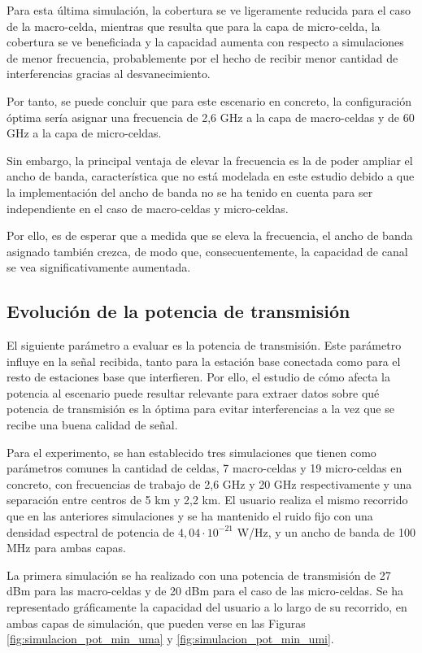Para esta última simulación, la cobertura se ve ligeramente reducida para el caso de la macro-celda, mientras que resulta que para la capa de micro-celda, la cobertura se ve beneficiada y la capacidad aumenta con respecto a simulaciones de menor frecuencia, probablemente por el hecho de recibir menor cantidad de interferencias gracias al desvanecimiento.

Por tanto, se puede concluir que para este escenario en concreto, la configuración óptima sería asignar una frecuencia de 2,6 GHz a la capa de macro-celdas y de 60 GHz a la capa de micro-celdas.

Sin embargo, la principal ventaja de elevar la frecuencia es la de poder ampliar el ancho de banda, característica que no está modelada en este estudio debido a que la implementación del ancho de banda no se ha tenido en cuenta para ser independiente en el caso de macro-celdas y micro-celdas.

Por ello, es de esperar que a medida que se eleva la frecuencia, el ancho de banda asignado también crezca, de modo que, consecuentemente, la capacidad de canal se vea significativamente aumentada.

\subsection{Evolución de la potencia de transmisión}

El siguiente parámetro a evaluar es la potencia de transmisión. Este parámetro influye en la señal recibida, tanto para la estación base conectada como para el resto de estaciones base que interfieren. Por ello, el estudio de cómo afecta la potencia al escenario puede resultar relevante para extraer datos sobre qué potencia de transmisión es la óptima para evitar interferencias a la vez que se recibe una buena calidad de señal.

Para el experimento, se han establecido tres simulaciones que tienen como parámetros comunes la cantidad de celdas, 7 macro-celdas y 19 micro-celdas en concreto, con frecuencias de trabajo de 2,6 GHz y 20 GHz respectivamente y una separación entre centros de 5 km y 2,2 km. El usuario realiza el mismo recorrido que en las anteriores simulaciones y se ha mantenido el ruido fijo con una densidad espectral de potencia de $4,04·10^{-21}$ W/Hz, y un ancho de banda de 100 MHz para ambas capas.

La primera simulación se ha realizado con una potencia de transmisión de 27 dBm para las macro-celdas y de 20 dBm para el caso de las micro-celdas. Se ha representado gráficamente la capacidad del usuario a lo largo de su recorrido, en ambas capas de simulación, que pueden verse en las Figuras \ref{fig:simulacion_pot_min_uma} y \ref{fig:simulacion_pot_min_umi}.

